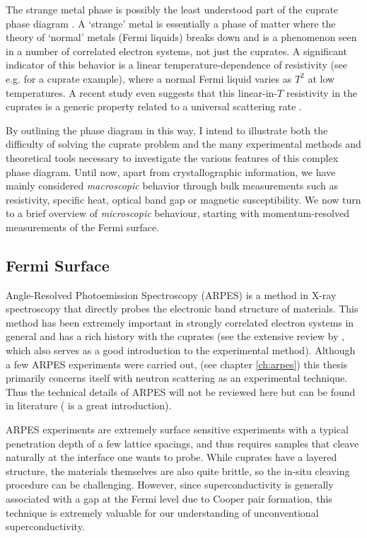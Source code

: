 The strange metal phase is possibly the least understood part of the cuprate phase diagram \cite{Keimer2015}. A `strange' metal is essentially a phase of matter where the theory of `normal' metals (Fermi liquids) breaks down and is a phenomenon seen in a number of correlated electron systems, not just the cuprates. A significant indicator of this behavior is a linear temperature-dependence of resistivity (see e.g. \cite{Martin1990} for a cuprate example), where a normal Fermi liquid varies as $T^2$ at low temperatures. A recent study even suggests that this linear-in-$T$ resistivity in the cuprates is a generic property related to a universal scattering rate \cite{Legros2018}.

By outlining the phase diagram in this way, I intend to illustrate both the difficulty of solving the cuprate problem and the many experimental methods and theoretical tools necessary to investigate the various features of this complex phase diagram. Until now, apart from crystallographic information, we have mainly considered \emph{macroscopic} behavior through bulk measurements such as resistivity, specific heat, optical band gap or magnetic susceptibility. We now turn to a brief overview of \emph{microscopic} behaviour, starting with momentum-resolved measurements of the Fermi surface.

\subsection{Fermi Surface}
Angle-Resolved Photoemission Spectroscopy (ARPES) is a method in X-ray spectroscopy that directly probes the electronic band structure of materials. This method has been extremely important in strongly correlated electron systems in general and has a rich history with the cuprates (see the extensive review by \citeauthor{Damascelli2003} \cite{Damascelli2003}, which also serves as a good introduction to the experimental method). Although a few ARPES experiments were carried out, (see chapter \ref{ch:arpes}) this thesis primarily concerns itself with neutron scattering as an experimental technique. Thus the technical details of ARPES will not be reviewed here but can be found in literature (\cite{Osterwalder2014} is a great introduction).

ARPES experiments are extremely surface sensitive experiments with a typical penetration depth of a few lattice spacings, and thus requires samples that cleave naturally at the interface one wants to probe. While cuprates have a layered structure, the materials themselves are also quite brittle, so the in-situ cleaving procedure can be challenging. However, since superconductivity is generally associated with a gap at the Fermi level due to Cooper pair formation, this technique is extremely valuable for our understanding of unconventional superconductivity.

